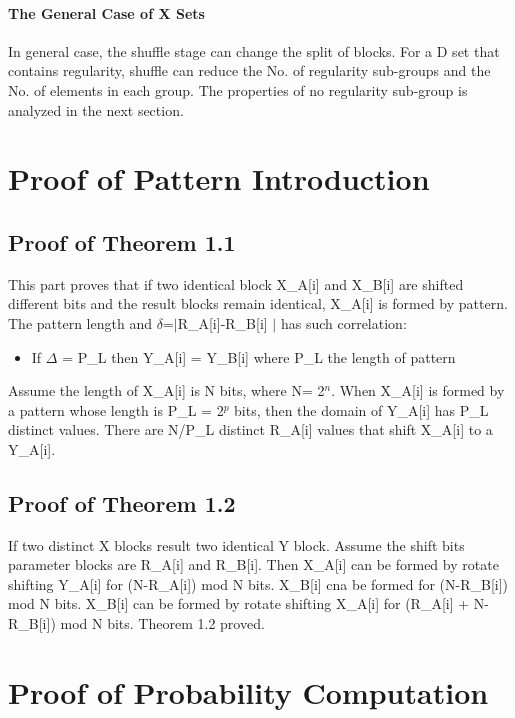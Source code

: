 \documentclass{article}
\begin{document}
\paragraph{The General Case of X Sets}
In general case, the shuffle stage can change the split of blocks. For a D set that contains regularity, shuffle can reduce the No. of regularity sub-groups and the No. of elements in each group. The properties of no regularity sub-group is analyzed in the next section.

\appendix
\section{Proof of Pattern Introduction}
\subsection{Proof of Theorem 1.1}
This part proves that if two identical block X\_A[i]  and X\_B[i] are shifted different bits and the result blocks remain identical, X\_A[i] is formed by pattern. The pattern length and $\delta$=$\mid$R\_A[i]-R\_B[i] $\mid$ has such correlation:
\begin{itemize}
	\item If $\Delta$ = P\_L then Y\_A[i] = Y\_B[i] where P\_L the length of pattern
\end{itemize}
Assume the length of X\_A[i] is N bits, where N= 2$^n$. When X\_A[i] is formed by a pattern whose length is P\_L = 2$^p$ bits, then the domain of Y\_A[i] has P\_L distinct values. There are N/P\_L distinct R\_A[i] values that shift X\_A[i] to a Y\_A[i].  




\subsection{Proof of Theorem 1.2}
If two distinct X blocks result two identical Y block. Assume the shift bits parameter blocks are R\_A[i] and R\_B[i]. Then X\_A[i] can be formed by rotate shifting Y\_A[i] for (N-R\_A[i]) mod N bits. X\_B[i] cna be formed for (N-R\_B[i]) mod N bits.
X\_B[i] can be formed by rotate shifting X\_A[i] for (R\_A[i] + N-R\_B[i]) mod N bits. Theorem 1.2 proved.

\section{Proof of Probability Computation}
\end{document}
